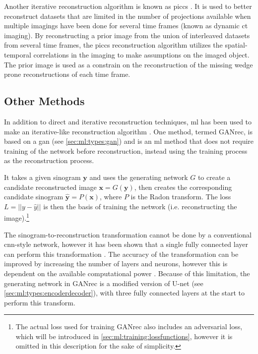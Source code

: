 Another iterative reconstruction algorithm is known as \gls{piccs} \cite{piccs}. It is used to better reconstruct datasets that are limited in the number of projections available when multiple imagings have been done for several time frames (known as dynamic \gls{ct} imaging). By reconstructing a prior image from the union of interleaved datasets from several time frames, the \gls{piccs} reconstruction algorithm utilizes the spatial-temporal correlations in the imaging to make assumptions on the imaged object. The prior image is used as a constrain on the reconstruction of the missing wedge prone reconstructions of each time frame. 


\subsection{Other Methods}
In addition to direct and iterative reconstruction techniques, \gls{ml} has been used to make an iterative-like reconstruction algorithm \cite{GANrec}. One method, termed GANrec, is based on a \gls{gan} (see \cref{sec:ml:types:gan}) and is an \gls{ml} method that does not require training of the network before reconstruction, instead using the training process as the reconstruction process. 

It takes a given sinogram $\bm{y}$ and uses the generating network $G$ to create a candidate reconstructed image $\bm{x} = G(\bm{y})$, then creates the corresponding candidate sinogram $\hat{\bm{y}} = P(\bm{x})$, where $P$ is the Radon transform. The loss $L = \left|\left| y - \hat{y} \right|\right|$ is then the basis of training the network (i.e. reconstructing the image).\footnote{The actual loss used for training GANrec also includes an adversarial loss, which will be introduced in \cref{sec:ml:training:lossfunctions}, however it is omitted in this description for the sake of simplicity. }

The sinogram-to-reconstruction transformation cannot be done by a conventional \gls{cnn}-style network, however it has been shown that a single fully connected layer can perform this transformation \cite{PASCHALIS2004211}. The accuracy of the transformation can be improved by increasing the number of layers and neurons, however this is dependent on the available computational power \cite{GANrec}. Because of this limitation, the generating network in GANrec is a modified version of U-net \cite{unet} (see \cref{sec:ml:types:encoderdecoder}), with three fully connected layers at the start to perform this transform. 